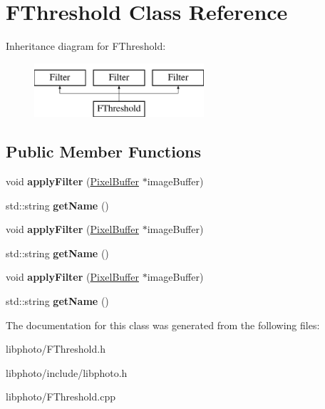 \hypertarget{classFThreshold}{\section{F\-Threshold Class Reference}
\label{classFThreshold}
}
Inheritance diagram for F\-Threshold\-:\begin{figure}[H]
\begin{center}
\leavevmode
\includegraphics[height=2.000000cm]{classFThreshold}
\end{center}
\end{figure}
\subsection*{Public Member Functions}
\begin{DoxyCompactItemize}
\item 
\hypertarget{classFThreshold_a324dadf15c23bd2d2edf6ea32e3d87f6}{void {\bfseries apply\-Filter} (\hyperlink{classPixelBuffer}{Pixel\-Buffer} $\ast$image\-Buffer)}\label{classFThreshold_a324dadf15c23bd2d2edf6ea32e3d87f6}

\item 
\hypertarget{classFThreshold_a189f8f15c0719706a7eb191b198c0b15}{std\-::string {\bfseries get\-Name} ()}\label{classFThreshold_a189f8f15c0719706a7eb191b198c0b15}

\item 
\hypertarget{classFThreshold_a324dadf15c23bd2d2edf6ea32e3d87f6}{void {\bfseries apply\-Filter} (\hyperlink{classPixelBuffer}{Pixel\-Buffer} $\ast$image\-Buffer)}\label{classFThreshold_a324dadf15c23bd2d2edf6ea32e3d87f6}

\item 
\hypertarget{classFThreshold_a189f8f15c0719706a7eb191b198c0b15}{std\-::string {\bfseries get\-Name} ()}\label{classFThreshold_a189f8f15c0719706a7eb191b198c0b15}

\item 
\hypertarget{classFThreshold_a324dadf15c23bd2d2edf6ea32e3d87f6}{void {\bfseries apply\-Filter} (\hyperlink{classPixelBuffer}{Pixel\-Buffer} $\ast$image\-Buffer)}\label{classFThreshold_a324dadf15c23bd2d2edf6ea32e3d87f6}

\item 
\hypertarget{classFThreshold_a189f8f15c0719706a7eb191b198c0b15}{std\-::string {\bfseries get\-Name} ()}\label{classFThreshold_a189f8f15c0719706a7eb191b198c0b15}

\end{DoxyCompactItemize}


The documentation for this class was generated from the following files\-:\begin{DoxyCompactItemize}
\item 
libphoto/F\-Threshold.\-h\item 
libphoto/include/libphoto.\-h\item 
libphoto/F\-Threshold.\-cpp\end{DoxyCompactItemize}
